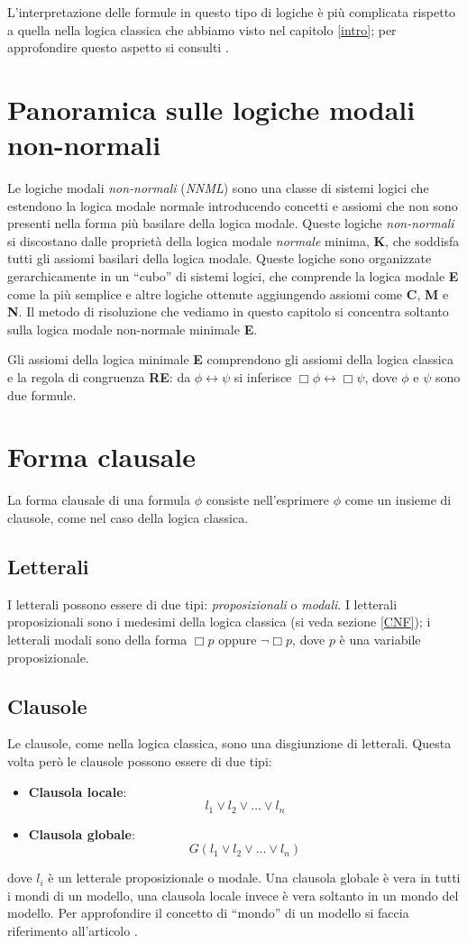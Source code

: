 \documentclass[a4paper,12pt]{report}
\newcommand{\tto} {\leftrightarrow}
\begin{document}
L'interpretazione delle formule in questo tipo di logiche è più complicata rispetto a quella nella logica classica che abbiamo visto nel capitolo \ref{intro}; per approfondire questo aspetto si consulti \cite{Articolo_resolution}.

\section{Panoramica sulle logiche modali non-normali}
Le logiche modali \emph{non-normali} (\emph{NNML}) sono una classe di sistemi logici che estendono la logica modale normale introducendo concetti e assiomi che non sono presenti nella forma più basilare della logica modale. Queste logiche \emph{non-normali} si discostano dalle proprietà della logica modale \emph{normale} minima, \textbf{K}, che soddisfa tutti gli assiomi basilari della logica modale. Queste logiche sono organizzate gerarchicamente in un ``cubo'' di sistemi logici, che comprende la logica modale \textbf{E} come la più semplice e altre logiche ottenute aggiungendo assiomi come \textbf{C}, \textbf{M} e \textbf{N}. Il metodo di risoluzione che vediamo in questo capitolo si concentra soltanto sulla logica modale non-normale minimale \textbf{E}.

Gli assiomi della logica minimale \textbf{E} comprendono gli assiomi della logica classica e la regola di congruenza \textbf{RE}: da $\phi \tto \psi$ si inferisce $\Box \phi \tto \Box \psi$, dove $\phi$ e $\psi$ sono due formule.

\section{Forma clausale}
La forma clausale di una formula $\phi$ consiste nell'esprimere $\phi$ come un insieme di clausole, come nel caso della logica classica.
\subsection*{Letterali}
I letterali possono essere di due tipi: \emph{proposizionali} o \emph{modali}. I letterali proposizionali sono i medesimi della logica classica (si veda sezione \ref{CNF}); i letterali modali sono della forma $\Box p$ oppure $\lnot \Box p$, dove $p$ è una variabile proposizionale.
\subsection*{Clausole}
Le clausole, come nella logica classica, sono una disgiunzione di letterali. Questa volta però le clausole possono essere di due tipi: 
\begin{itemize}
    \item \textbf{Clausola locale}: \[ l_1 \lor l_2 \lor \ldots \lor l_n \]
    \item \textbf{Clausola globale}: \[ G(l_1 \lor l_2 \lor \ldots \lor l_n) \]
\end{itemize}
dove $l_i$ è un letterale proposizionale o modale. Una clausola globale è vera in tutti i mondi di un modello, una clausola locale invece è vera soltanto in un mondo del modello. Per approfondire il concetto di ``mondo'' di un modello si faccia riferimento all'articolo \cite{Articolo_resolution}.
\end{document}
